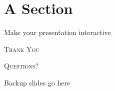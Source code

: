 \documentclass{article}
\begin{document}
\section{A Section}

\begin{frame}{Make your presentation interactive}
    \begin{cublock}
        \begin{overlayarea}{\textwidth}{\baselineskip}
        \end{overlayarea}
    \end{cublock}
\end{frame}

\begin{frame}[standout]
    \Huge\textsc{Thank You}
    
    \vfill
    
    \LARGE\textsc{Questions?}
\end{frame}



\begin{frame}{Backup slides go here}
    
\end{frame}
\end{document}
